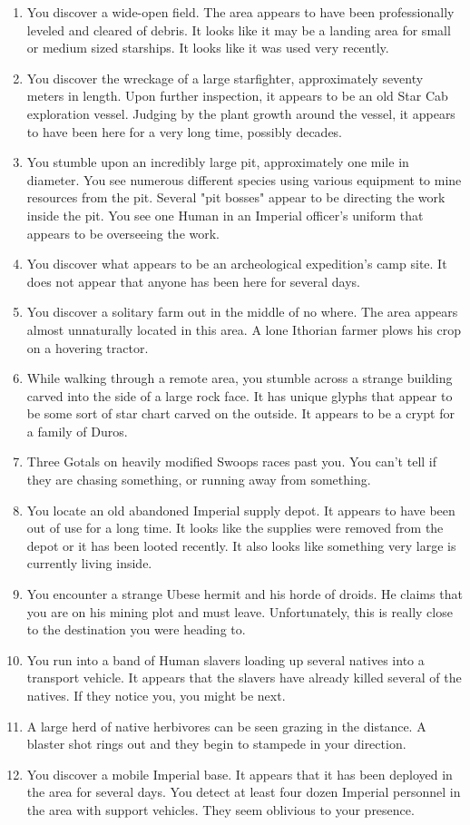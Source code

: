\documentclass{article}
\begin{document}
\begin{enumerate}
	\item You discover a wide-open field. The area appears to have been professionally leveled and cleared of debris. It looks like it may be a landing area for small or medium sized starships. It looks like it was used very recently.
	\item You discover the wreckage of a large starfighter, approximately seventy meters in length. Upon further inspection, it appears to be an old Star Cab exploration vessel. Judging by the plant growth around the vessel, it appears to have been here for a very long time, possibly decades.
	\item You stumble upon an incredibly large pit, approximately one mile in diameter. You see numerous different species using various equipment to mine resources from the pit. Several "pit bosses" appear to be directing the work inside the pit. You see one Human in an Imperial officer’s uniform that appears to be overseeing the work.
	\item You discover what appears to be an archeological expedition’s camp site. It does not appear that anyone has been here for several days.
	\item You discover a solitary farm out in the middle of no where. The area appears almost unnaturally located in this area. A lone Ithorian farmer plows his crop on a hovering tractor.
	\item While walking through a remote area, you stumble across a strange building carved into the side of a large rock face. It has unique glyphs that appear to be some sort of star chart carved on the outside. It appears to be a crypt for a family of Duros.
	\item Three Gotals on heavily modified Swoops races past you. You can’t tell if they are chasing something, or running away from something.
	\item You locate an old abandoned Imperial supply depot. It appears to have been out of use for a long time. It looks like the supplies were removed from the depot or it has been looted recently. It also looks like something very large is currently living inside.
	\item You encounter a strange Ubese hermit and his horde of droids. He claims that you are on his mining plot and must leave. Unfortunately, this is really close to the destination you were heading to.
	\item You run into a band of Human slavers loading up several natives into a transport vehicle. It appears that the slavers have already killed several of the natives. If they notice you, you might be next.
	\item A large herd of native herbivores can be seen grazing in the distance. A blaster shot rings out and they begin to stampede in your direction.
	\item You discover a mobile Imperial base. It appears that it has been deployed in the area for several days. You detect at least four dozen Imperial personnel in the area with support vehicles. They seem oblivious to your presence.
\end{enumerate}
\end{document}
